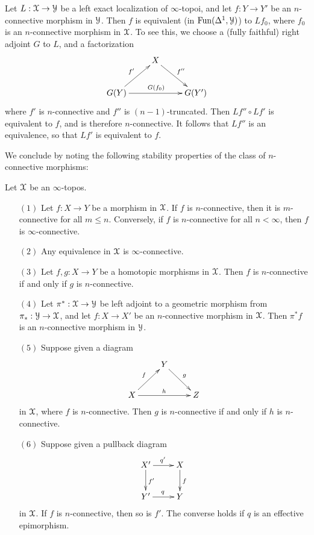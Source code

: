 \begin{remark}\label{nconn}
Let $L: \operatorname{\mathcal{X}} \rightarrow \operatorname{\mathcal{Y}}$ be a left exact localization of $\infty$-topoi, and let
$f: Y \rightarrow Y'$ be an $n$-connective morphism in $\operatorname{\mathcal{Y}}$. Then $f$ is equivalent (in $\operatorname{Fun}(\Delta^1,\operatorname{\mathcal{Y}})$) to $Lf_0$, where $f_0$ is an $n$-connective morphism in $\operatorname{\mathcal{X}}$.
To see this, we choose a (fully faithful) right adjoint $G$ to $L$, and a factorization
$$ \xymatrix{ & X \ar[dr]^{f''} & \\
G(Y) \ar[ur]^{f'} \ar[rr]^{ G(f_0)} & & G(Y') }$$
where $f'$ is $n$-connective and $f''$ is $(n-1)$-truncated. Then
$Lf'' \circ Lf'$ is equivalent to $f$, and is therefore $n$-connective. It follows that $Lf''$ is
an equivalence, so that $Lf'$ is equivalent to $f$.
\end{remark}

We conclude by noting the following stability properties of the
class of $n$-connective morphisms:

\begin{proposition}\label{inftychange}
Let $\operatorname{\mathcal{X}}$ be an $\infty$-topos.
\begin{itemize}
\item[$(1)$] Let $f: X \rightarrow Y$ be a morphism in $\operatorname{\mathcal{X}}$. If $f$
is $n$-connective, then it is $m$-connective for all $m \leq n$. Conversely, if
$f$ is $n$-connective for all $n < \infty$, then $f$ is $\infty$-connective.

\item[$(2)$] Any equivalence in $\operatorname{\mathcal{X}}$ is $\infty$-connective.

\item[$(3)$] Let $f,g: X \rightarrow Y$ be a homotopic morphisms in $\operatorname{\mathcal{X}}$. Then
$f$ is $n$-connective if and only if $g$ is $n$-connective.

\item[$(4)$] Let $\pi^{\ast}: \operatorname{\mathcal{X}} \rightarrow \operatorname{\mathcal{Y}}$ be left adjoint to a geometric morphism
from $\pi_{\ast}: \operatorname{\mathcal{Y}} \rightarrow \operatorname{\mathcal{X}}$, and let $f: X \rightarrow X'$ be an $n$-connective
morphism in $\operatorname{\mathcal{X}}$. Then $\pi^{\ast} f$ is an $n$-connective morphism in $\operatorname{\mathcal{Y}}$.

\item[$(5)$] Suppose given a diagram
$$ \xymatrix{ & Y \ar[dr]^{g} & \\
X \ar[ur]^{f} \ar[rr]^{h} & & Z }$$
in $\operatorname{\mathcal{X}}$, where $f$ is $n$-connective. Then $g$ is $n$-connective if and only if
$h$ is $n$-connective. 

\item[$(6)$] Suppose given a pullback diagram
$$ \xymatrix{ X' \ar[d]^{f'} \ar[r]^{q'} & X \ar[d]^{f} \\
Y' \ar[r]^{q} & Y }$$
in $\operatorname{\mathcal{X}}$. If $f$ is $n$-connective, then so is $f'$. The converse holds if $q$ is an effective epimorphism.
\end{itemize}
\end{proposition}

